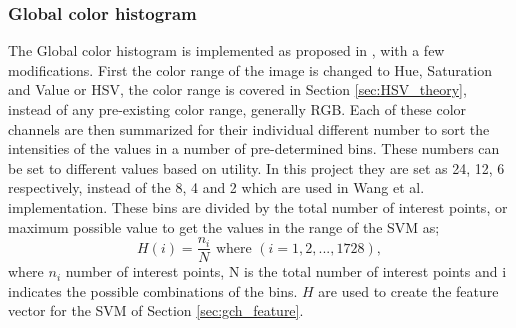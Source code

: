 \subsubsection{Global color histogram}
\label{sec:meth:featextr:gch}

The Global color histogram is implemented as proposed in \cite{wang2015new}, with a few modifications. First the color range of the image is changed to Hue, Saturation and Value or HSV, the color range is covered in Section \ref{sec:HSV_theory}, instead of any pre-existing color range, generally RGB. Each of these color channels are then summarized for their individual different number to sort the intensities of the values in a number of pre-determined bins. These numbers can be set to different values based on utility. In this project they are set as 24, 12, 6 respectively, instead of the 8, 4 and 2 which are used in Wang et al. implementation. These bins are divided by the total number of interest points, or maximum possible value to get the values in the range of the SVM as;
\begin{equation}
H(i) = \frac{n_i}{N} \mbox{ where } (i = 1, 2, ..., 1728),
\end{equation}
where $n_i$ number of interest points, N is the total number of interest points and i indicates the possible combinations of the bins. $H$ are used to create the feature vector for the SVM of Section \ref{sec:gch_feature}.


